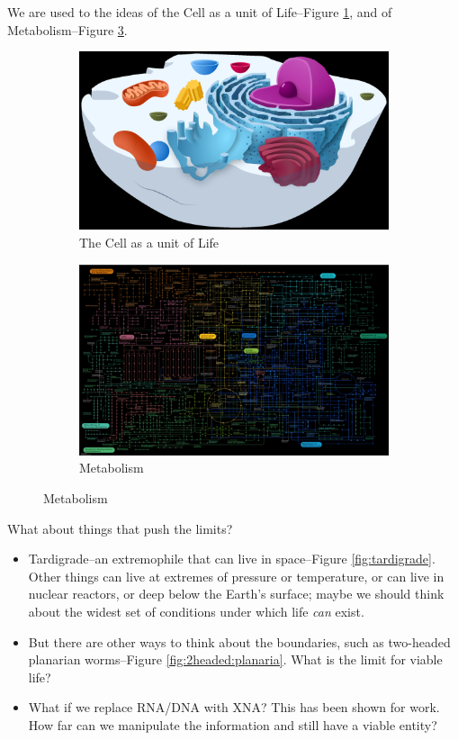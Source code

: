 \documentclass[]{article}
\begin{document}
 We are used to the ideas of the Cell as a unit of Life--Figure \ref{fig:cell}, and of Metabolism--Figure \ref{fig:metabolism}. 
 \begin{figure}[H]
 	\caption{Traditional view of Life}
 	\begin{subfigure}[t]{0.45\textwidth}
 		\caption{The Cell as a unit of Life}\label{fig:cell}
 		\includegraphics[width=\textwidth]{Cell}
 	\end{subfigure}
 	\begin{subfigure}[t]{0.45\textwidth}
 		\caption{Metabolism}\label{fig:metabolism}
 		\includegraphics[width=\textwidth]{Metabolism}
 	\end{subfigure}	
 \end{figure}
What about things that push the limits?
\begin{itemize}
	\item Tardigrade--an extremophile that can live in space--Figure \ref{fig:tardigrade}. Other things can live at extremes of pressure or temperature, or can live in nuclear reactors, or deep below the Earth's surface; maybe we should think about the widest set of conditions under which life \textit{can} exist. 
	\item But there are other ways to think about the boundaries, such as two-headed planarian worms--Figure \ref{fig:2headed:planaria}\cite{levin2019planarian}. What is the limit for viable life?
	\item What if we replace RNA/DNA with XNA? This has been shown for work. How far can we manipulate the information and still have a viable entity?

\end{itemize}
\end{document}
